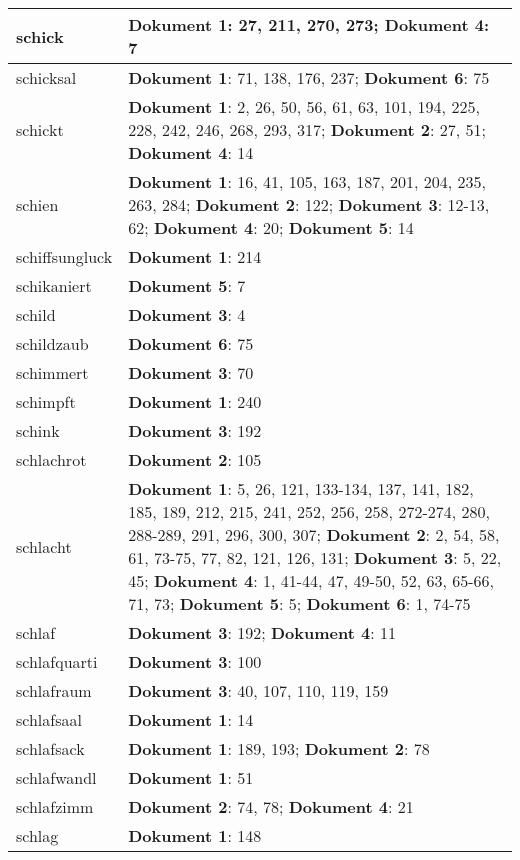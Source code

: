 \documentclass[a5paper]{article}
\begin{document}
\begin{longtable}[l]{|l|p{3in}|}
\hline
schick & \textbf{Dokument 1}: 27, 211, 270, 273; \textbf{Dokument 4}: 7 \\
\hline
schicksal & \textbf{Dokument 1}: 71, 138, 176, 237; \textbf{Dokument 6}: 75 \\
\hline
schickt & \textbf{Dokument 1}: 2, 26, 50, 56, 61, 63, 101, 194, 225, 228, 242, 246, 268, 293, 317; \textbf{Dokument 2}: 27, 51; \textbf{Dokument 4}: 14 \\
\hline
schien & \textbf{Dokument 1}: 16, 41, 105, 163, 187, 201, 204, 235, 263, 284; \textbf{Dokument 2}: 122; \textbf{Dokument 3}: 12-13, 62; \textbf{Dokument 4}: 20; \textbf{Dokument 5}: 14 \\
\hline
schiffsungluck & \textbf{Dokument 1}: 214 \\
\hline
schikaniert & \textbf{Dokument 5}: 7 \\
\hline
schild & \textbf{Dokument 3}: 4 \\
\hline
schildzaub & \textbf{Dokument 6}: 75 \\
\hline
schimmert & \textbf{Dokument 3}: 70 \\
\hline
schimpft & \textbf{Dokument 1}: 240 \\
\hline
schink & \textbf{Dokument 3}: 192 \\
\hline
schlachrot & \textbf{Dokument 2}: 105 \\
\hline
schlacht & \textbf{Dokument 1}: 5, 26, 121, 133-134, 137, 141, 182, 185, 189, 212, 215, 241, 252, 256, 258, 272-274, 280, 288-289, 291, 296, 300, 307; \textbf{Dokument 2}: 2, 54, 58, 61, 73-75, 77, 82, 121, 126, 131; \textbf{Dokument 3}: 5, 22, 45; \textbf{Dokument 4}: 1, 41-44, 47, 49-50, 52, 63, 65-66, 71, 73; \textbf{Dokument 5}: 5; \textbf{Dokument 6}: 1, 74-75 \\
\hline
schlaf & \textbf{Dokument 3}: 192; \textbf{Dokument 4}: 11 \\
\hline
schlafquarti & \textbf{Dokument 3}: 100 \\
\hline
schlafraum & \textbf{Dokument 3}: 40, 107, 110, 119, 159 \\
\hline
schlafsaal & \textbf{Dokument 1}: 14 \\
\hline
schlafsack & \textbf{Dokument 1}: 189, 193; \textbf{Dokument 2}: 78 \\
\hline
schlafwandl & \textbf{Dokument 1}: 51 \\
\hline
schlafzimm & \textbf{Dokument 2}: 74, 78; \textbf{Dokument 4}: 21 \\
\hline
schlag & \textbf{Dokument 1}: 148 \\
\hline

\end{longtable}
\end{document}
